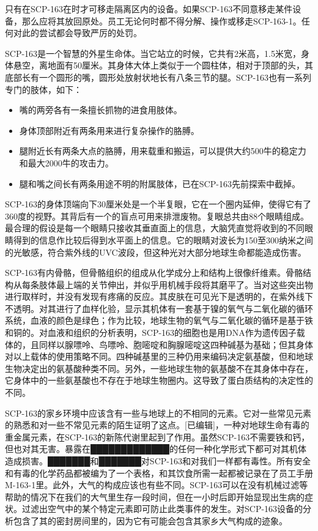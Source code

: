只有在SCP-163在时才可移走隔离区内的设备。如果SCP-163不同意移走某件设备，那么应将其放回原处。员工无论何时都不得分解、操作或移走SCP-163-1。任何对此的尝试都会导致严厉的处罚。

SCP-163是一个智慧的外星生命体。当它站立的时候，它共有2米高，1.5米宽，身体悬空，离地面有50厘米。其身体大体上类似于一个圆柱体，相对于顶部的头，其底部长有一个圆形的嘴，圆形处放射状地长有八条三节的腿。SCP-163也有一系列专门的肢体，如下：

\begin{itemize}
    \item 嘴的两旁各有一条擅长抓物的进食用肢体。
    \item 身体顶部附近有两条用来进行复杂操作的胳膊。
    \item 腿附近长有两条大点的胳膊，用来载重和搬运，可以提供大约500牛的稳定力和最大2000牛的攻击力。
    \item 腿和嘴之间长有两条用途不明的附属肢体，已在SCP-163先前探索中截掉。
\end{itemize}

SCP-163的身体顶端向下30厘米处是一个半复眼，它在一个圈内延伸，使得它有了360度的视野。其背后有一个的盲点可用来排泄废物。复眼总共由88个眼睛组成。最合理的假设是每一个眼睛只接收其垂直面上的信息，大脑凭直觉将收到的不同眼睛得到的信息作比较后得到水平面上的信息。它的眼睛对波长为150至300纳米之间的光敏感，符合紫外线的UVC波段，但这种光对大部分地球生命都能造成伤害。

SCP-163有内骨骼，但骨骼组织的组成从化学成分上和结构上很像纤维素。骨骼结构从每条肢体最上端的关节伸出，并似乎用机械手段将其磨平了。当对这些突出物进行取样时，并没有发现有疼痛的反应。其皮肤在可见光下是透明的，在紫外线下不透明。对其进行了血样化验，显示其机体有一套基于镍的氧气与二氧化碳的循环系统，血液的颜色是绿色；作为比较，地球生物的氧气与二氧化碳的循环是基于铁和铜的。对血液和组织的分析表明，SCP-163的细胞也是用DNA作为遗传因子载体的，且同样以腺嘌呤、鸟嘌呤、胞嘧啶和胸腺嘧啶这四种碱基为基础；但其身体对以上载体的使用策略不同。四种碱基里的三种仍用来编码决定氨基酸，但和地球生物决定出的氨基酸种类不同。另外，一些地球生物的氨基酸不在其身体中存在，它身体中的一些氨基酸也不存在于地球生物圈内。这导致了蛋白质结构的决定性的不同。

SCP-163的家乡环境中应该含有一些与地球上的不相同的元素。它对一些常见元素的熟悉和对一些不常见元素的陌生证明了这点。{[}已编辑]，一种对地球生命有毒的重金属元素，在SCP-163的新陈代谢里起到了作用。虽然SCP-163不需要铁和钙，但也对其无害。暴露在█████████████的任何一种化学形式下都可对其机体造成损害。███████和███████对SCP-163和对我们一样都有毒性。所有安全和有毒的化学药品都被编为了一个表格，和其饮食所需一起都被记录在了员工手册M-163-1里。此外，大气的构成应该也有些不同。SCP-163可以在没有机械过滤等帮助的情况下在我们的大气里生存一段时间，但在一小时后即开始显现出生病的症状。过滤出空气中的某个特定元素即可防止此类事件的发生。对SCP-163设备的分析包含了其的密封房间里的，因为它有可能会包含其家乡大气构成的迹象。

